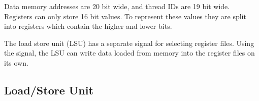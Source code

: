 \documentclass[../main/report.tex]{subfiles}
\begin{document}
Data memory addresses are 20 bit wide, and thread IDs are 19 bit wide.
Registers can only store 16 bit values.	
To represent these values they are split into registers which contain the higher and lower bits.

The load store unit (LSU) has a separate signal for selecting register files.
Using the signal, the LSU can write data loaded from memory into the register files on its own.


\subsection{Load/Store Unit}
\end{document}
